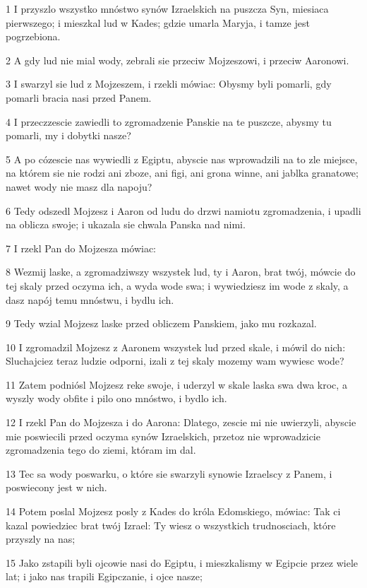 \par 1 I przyszlo wszystko mnóstwo synów Izraelskich na puszcza Syn, miesiaca pierwszego; i mieszkal lud w Kades; gdzie umarla Maryja, i tamze jest pogrzebiona.
\par 2 A gdy lud nie mial wody, zebrali sie przeciw Mojzeszowi, i przeciw Aaronowi.
\par 3 I swarzyl sie lud z Mojzeszem, i rzekli mówiac: Obysmy byli pomarli, gdy pomarli bracia nasi przed Panem.
\par 4 I przeczzescie zawiedli to zgromadzenie Panskie na te puszcze, abysmy tu pomarli, my i dobytki nasze?
\par 5 A po cózescie nas wywiedli z Egiptu, abyscie nas wprowadzili na to zle miejsce, na którem sie nie rodzi ani zboze, ani figi, ani grona winne, ani jablka granatowe; nawet wody nie masz dla napoju?
\par 6 Tedy odszedl Mojzesz i Aaron od ludu do drzwi namiotu zgromadzenia, i upadli na oblicza swoje; i ukazala sie chwala Panska nad nimi.
\par 7 I rzekl Pan do Mojzesza mówiac:
\par 8 Wezmij laske, a zgromadziwszy wszystek lud, ty i Aaron, brat twój, mówcie do tej skaly przed oczyma ich, a wyda wode swa; i wywiedziesz im wode z skaly, a dasz napój temu mnóstwu, i bydlu ich.
\par 9 Tedy wzial Mojzesz laske przed obliczem Panskiem, jako mu rozkazal.
\par 10 I zgromadzil Mojzesz z Aaronem wszystek lud przed skale, i mówil do nich: Sluchajciez teraz ludzie odporni, izali z tej skaly mozemy wam wywiesc wode?
\par 11 Zatem podniósl Mojzesz reke swoje, i uderzyl w skale laska swa dwa kroc, a wyszly wody obfite i pilo ono mnóstwo, i bydlo ich.
\par 12 I rzekl Pan do Mojzesza i do Aarona: Dlatego, zescie mi nie uwierzyli, abyscie mie poswiecili przed oczyma synów Izraelskich, przetoz nie wprowadzicie zgromadzenia tego do ziemi, któram im dal.
\par 13 Tec sa wody poswarku, o które sie swarzyli synowie Izraelscy z Panem, i poswiecony jest w nich.
\par 14 Potem poslal Mojzesz posly z Kades do króla Edomskiego, mówiac: Tak ci kazal powiedziec brat twój Izrael: Ty wiesz o wszystkich trudnosciach, które przyszly na nas;
\par 15 Jako zstapili byli ojcowie nasi do Egiptu, i mieszkalismy w Egipcie przez wiele lat; i jako nas trapili Egipczanie, i ojce nasze;
